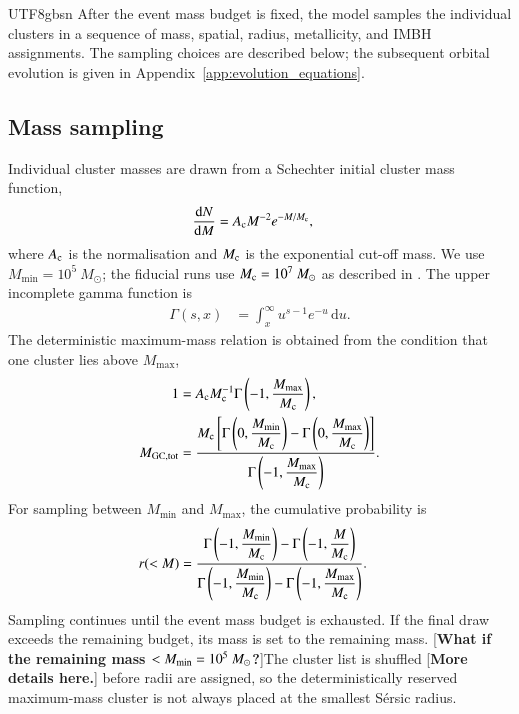 \documentclass[trackchanges, twocolappendix, twocolumn]{aastex701}
\newcommand{\czkong}[1]{{\color{magenta}[\textbf{#1}]}}
\begin{document}
\begin{CJK*}{UTF8}{gbsn}
After the event mass budget is fixed, the model samples the individual clusters in a sequence of mass, spatial, radius, metallicity, and IMBH assignments. The sampling choices are described below; the subsequent orbital evolution is given in Appendix~\ref{app:evolution_equations}.

\subsection{Mass sampling}
\label{subsubsect:mass_sampling}

Individual cluster masses are drawn from a Schechter initial cluster mass function,
\begin{align}
\dfrac{\mathrm{d}N}{\mathrm{d}M} & = A_{\rm c}M^{-2}e^{-M/M_{\rm c}},
\label{eq:cimf}
\end{align}
where $A_{\rm c}$ is the normalisation and $M_{\rm c}$ is the exponential cut-off mass. We use $M_{\min}=10^5~M_\odot$; the fiducial runs use $M_{\rm c}=10^7~M_\odot$ as described in \cite{Choksi&Gnedin2019GC}. The upper incomplete gamma function is
\begin{align}
\Gamma(s,x) & = \int_x^{\infty} u^{s-1}e^{-u}\,\mathrm{d}u .
\end{align}
The deterministic maximum-mass relation is obtained from the condition that one cluster lies above $M_{\max}$,
\begin{align}
1 & = A_{\rm c}M_{\rm c}^{-1}\Gamma\left(-1,\dfrac{M_{\max}}{M_{\rm c}}\right),\\
M_{\rm GC,tot} & =
\dfrac{M_{\rm c}
\left[
\Gamma\left(0,\dfrac{M_{\min}}{M_{\rm c}}\right)
-\Gamma\left(0,\dfrac{M_{\max}}{M_{\rm c}}\right)
\right]}
{\Gamma\left(-1,\dfrac{M_{\max}}{M_{\rm c}}\right)}.
\end{align}
For sampling between $M_{\min}$ and $M_{\max}$, the cumulative probability is
\begin{align}
r(<M) & =
\dfrac{
\Gamma\left(-1,\dfrac{M_{\min}}{M_{\rm c}}\right)
-\Gamma\left(-1,\dfrac{M}{M_{\rm c}}\right)}
{
\Gamma\left(-1,\dfrac{M_{\min}}{M_{\rm c}}\right)
-\Gamma\left(-1,\dfrac{M_{\max}}{M_{\rm c}}\right)}.
\end{align}
Sampling continues until the event mass budget is exhausted. If the final draw exceeds the remaining budget, its mass is set to the remaining mass. \czkong{What if the remaining mass $< M_{\rm min} = 10^5~M_\odot$?}The cluster list is shuffled \czkong{More details here.} before radii are assigned, so the deterministically reserved maximum-mass cluster is not always placed at the smallest S{\'e}rsic radius.


\end{CJK*}
\end{document}

